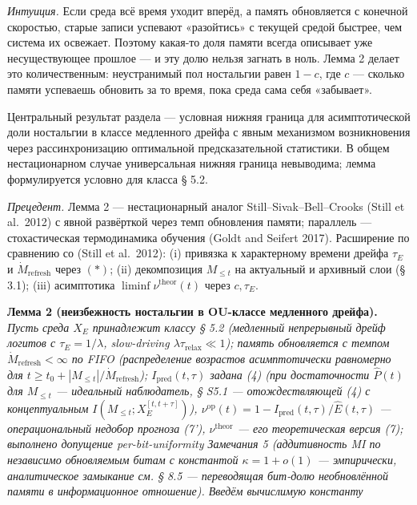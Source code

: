 \documentclass[pdflatex,sn-mathphys-ay]{sn-jnl}
\providecommand{\lt}{<}\providecommand{\gt}{>}
\begin{document}
\emph{Интуиция.} Если среда всё время уходит вперёд, а память обновляется с конечной скоростью, старые записи успевают «разойтись» с текущей средой быстрее, чем система их освежает. Поэтому какая-то доля памяти всегда описывает уже несуществующее прошлое --- и эту долю нельзя загнать в ноль. Лемма 2 делает это количественным: неустранимый пол ностальгии равен \(1-c\), где \(c\) --- сколько памяти успеваешь обновить за то время, пока среда сама себя «забывает».



Центральный результат раздела --- условная нижняя граница для асимптотической доли ностальгии в классе медленного дрейфа с явным механизмом возникновения через рассинхронизацию оптимальной предсказательной статистики. В общем нестационарном случае универсальная нижняя граница невыводима; лемма формулируется условно для класса § 5.2.



\emph{Прецедент.} Лемма 2 --- нестационарный аналог Still--Sivak--Bell--Crooks (Still et al.~2012) с явной развёрткой через темп обновления памяти; параллель --- стохастическая термодинамика обучения (Goldt and Seifert 2017). Расширение по сравнению со (Still et al.~2012): (i) привязка к характерному времени дрейфа \(\tau_E\) и \(\dot{M}_{\text{refresh}}\) через \((*)\); (ii) декомпозиция \(M_{\le t}\) на актуальный и архивный слои (§ 3.1); (iii) асимптотика \(\liminf \nu^{\text{theor}}(t)\) через \(c, \tau_E\).



\textbf{Лемма 2 (неизбежность ностальгии в OU-классе медленного дрейфа).} \emph{Пусть среда \(X_E\) принадлежит классу § 5.2 (медленный непрерывный дрейф логитов с \(\tau_E = 1/\lambda\), slow-driving \(\lambda \tau_{\text{relax}} \ll 1\)); память обновляется с темпом \(\dot{M}_{\text{refresh}} \lt \infty\) по FIFO (распределение возрастов асимптотически равномерно для \(t \ge t_0 + |M_{\le t}|/\dot{M}_{\text{refresh}}\)); \(I_{\text{pred}}(t,\tau)\) задана (4) (при достаточности \(\hat P(t)\) для \(M_{\le t}\) --- идеальный наблюдатель, § S5.1 --- отождествляющей (4) с концептуальным \(I(M_{\le t}; X_E^{[t,t+\tau]})\)), \(\nu^{\text{op}}(t) = 1 - I_{\text{pred}}(t,\tau)/\hat E(t,\tau)\) --- операциональный недобор прогноза (7'), \(\nu^{\text{theor}}\) --- его теоретическая версия (7); выполнено допущение per-bit-uniformity Замечания 5 (аддитивность MI по независимо обновляемым битам с константой \(\kappa = 1+o(1)\) --- эмпирически, аналитическое замыкание см. § 8.5 --- переводящая бит-долю необновлённой памяти в информационное отношение). Введём вычислимую константу}
\end{document}
